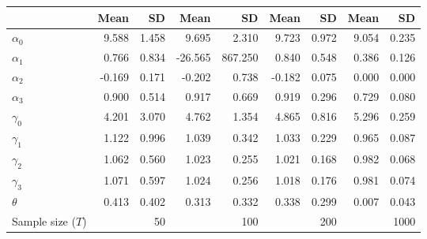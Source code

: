 
\begin{tabular}[t]{lrrrrrrrr}
\toprule
  & Mean & SD & Mean  & SD  & Mean   & SD   & Mean    & SD   \\
\midrule
$\alpha_{0}$ & 9.588 & 1.458 & 9.695 & 2.310 & 9.723 & 0.972 & 9.054 & 0.235\\
$\alpha_{1}$ & 0.766 & 0.834 & -26.565 & 867.250 & 0.840 & 0.548 & 0.386 & 0.126\\
$\alpha_{2}$ & -0.169 & 0.171 & -0.202 & 0.738 & -0.182 & 0.075 & 0.000 & 0.000\\
$\alpha_{3}$ & 0.900 & 0.514 & 0.917 & 0.669 & 0.919 & 0.296 & 0.729 & 0.080\\
$\gamma_{0}$ & 4.201 & 3.070 & 4.762 & 1.354 & 4.865 & 0.816 & 5.296 & 0.259\\
$\gamma_{1}$ & 1.122 & 0.996 & 1.039 & 0.342 & 1.033 & 0.229 & 0.965 & 0.087\\
$\gamma_{2}$ & 1.062 & 0.560 & 1.023 & 0.255 & 1.021 & 0.168 & 0.982 & 0.068\\
$\gamma_{3}$ & 1.071 & 0.597 & 1.024 & 0.256 & 1.018 & 0.176 & 0.981 & 0.074\\
$\theta$ & 0.413 & 0.402 & 0.313 & 0.332 & 0.338 & 0.299 & 0.007 & 0.043\\
Sample size ($T$) &  & 50 &  & 100 &  & 200 &  & 1000\\
\bottomrule
\end{tabular}
